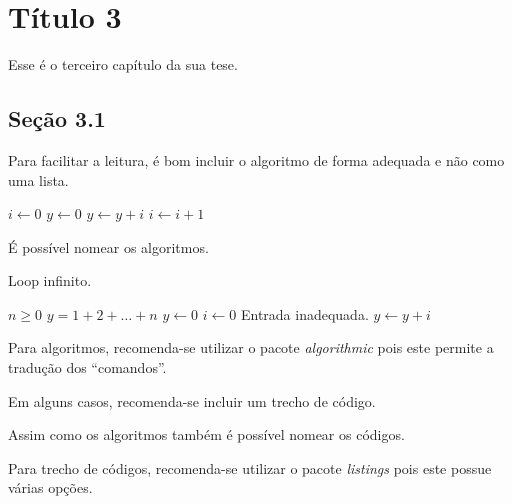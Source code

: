 \chapter{T\'itulo 3}
Esse \'e o terceiro cap\'itulo da sua tese.

\section{Se\c c\~ao 3.1}
Para facilitar a leitura, \'e bom incluir o algoritmo de forma adequada e n\~ao
como uma lista.
\begin{algorithmic}[2]
    \STATE $i \leftarrow 0$
    \STATE $y \leftarrow 0$
        \STATE $y \leftarrow y + i$
        \STATE $i \leftarrow i + 1$
    \ENDFOR
\end{algorithmic}

\'E poss\'ivel nomear os algoritmos.
\begin{algorithm}
    \caption{Loop infinito.}
    \label{alg:loop_inf}
    \begin{algorithmic}
        \REQUIRE $n \geq 0$
        \ENSURE $y = 1 + 2 + \ldots + n$
        \STATE $y \leftarrow 0$
        \STATE $i \leftarrow 0$
            \PRINT Entrada inadequada.
        \ELSE
                \STATE $y \leftarrow y + i$
            \ENDWHILE
        \ENDIF
    \end{algorithmic}
\end{algorithm}

Para algoritmos, recomenda-se utilizar o pacote
\emph{algorithmic} pois este
permite a tradu\c{c}\~ao dos ``comandos''.

Em alguns casos, recomenda-se incluir um trecho de
c\'odigo.


Assim como os algoritmos tamb\'em \'e poss\'ivel nomear os c\'odigos.


Para trecho de c\'odigos,  recomenda-se utilizar o pacote
\emph{listings} pois
este possue v\'arias op\c{c}\~oes.
